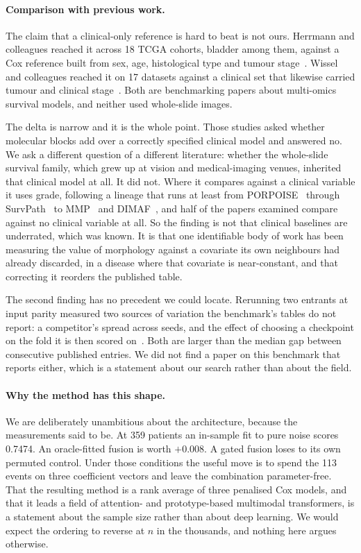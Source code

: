 \documentclass[11pt]{article}
\begin{document}
\paragraph{Comparison with previous work.} The claim that a
clinical-only reference is hard to beat is not ours. Herrmann and colleagues reached it across 18
TCGA cohorts, bladder among them, against a Cox reference built from sex, age, histological type and
tumour stage~\citep{herrmann2021benchmark}. Wissel and colleagues reached it on 17 datasets against
a clinical set that likewise carried tumour and clinical stage~\citep{wissel2023noise}. Both are
benchmarking papers about multi-omics survival models, and neither used whole-slide images.

The delta is narrow and it is the whole point. Those studies asked whether molecular blocks add over
a correctly specified clinical model and answered no. We ask a different question of a different
literature: whether the whole-slide survival family, which grew up at vision and medical-imaging
venues, inherited that clinical model at all. It did not. Where it compares against a clinical
variable it uses grade, following a lineage that runs at least from
PORPOISE~\citep{chen2022porpoise} through SurvPath~\citep{jaume2024survpath} to
MMP~\citep{song2024mmp} and DIMAF~\citep{eijpe2025dimaf}, and half of the papers examined compare against no clinical variable at all. So the finding is not that clinical baselines are
underrated, which was known. It is that one identifiable body of work has been measuring the value
of morphology against a covariate its own neighbours had already discarded, in a disease where that
covariate is near-constant, and that correcting it reorders the published table.

The second finding has no precedent we could locate. Rerunning two entrants at input parity
measured two sources of variation the benchmark's tables do not report: a competitor's spread across
seeds, and the effect of choosing a checkpoint on the fold it is then scored
on~\citep{zhang2024pibd}. Both are larger than the median gap between consecutive published entries.
We did not find a paper on this benchmark that reports either, which is a statement about our search
rather than about the field.

\paragraph{Why the method has this shape.} We are deliberately unambitious about the architecture, because the
measurements said to be. At 359 patients an in-sample fit to pure noise scores 0.7474. An
oracle-fitted fusion is worth $+0.008$. A gated fusion loses to its own permuted control. Under
those conditions the useful move is to spend the 113 events on three coefficient vectors and leave
the combination parameter-free. That the resulting method is a rank average of three penalised Cox
models, and that it leads a field of attention- and prototype-based multimodal transformers, is a
statement about the sample size rather than about deep learning. We would expect the ordering to
reverse at $n$ in the thousands, and nothing here argues otherwise.
\end{document}
